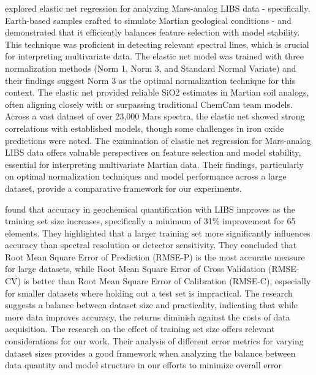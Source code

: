 \citeauthor{bai_application_2023} explored elastic net regression for analyzing Mars-analog LIBS data - specifically, Earth-based samples crafted to simulate Martian geological conditions - and demonstrated that it efficiently balances feature selection with model stability.
This technique was proficient in detecting relevant spectral lines, which is crucial for interpreting multivariate data.
The elastic net model was trained with three normalization methods (Norm 1, Norm 3, and Standard Normal Variate) and their findings suggest Norm 3 as the optimal normalization technique for this context.
The elastic net provided reliable SiO2 estimates in Martian soil analogs, often aligning closely with or surpassing traditional ChemCam team models.
Across a vast dataset of over 23,000 Mars spectra, the elastic net showed strong correlations with established models, though some challenges in iron oxide predictions were noted\cite{bai_application_2023}.
The examination of elastic net regression for Mars-analog LIBS data offers valuable perspectives on feature selection and model stability, essential for interpreting multivariate Martian data. Their findings, particularly on optimal normalization techniques and model performance across a large dataset, provide a comparative framework for our experiments.


\citeauthor{dyar_effect_2021} found that accuracy in geochemical quantification with LIBS improves as the training set size increases, specifically a minimum of 31\% improvement for 65 elements.
They highlighted that a larger training set more significantly influences accuracy than spectral resolution or detector sensitivity.
They concluded that Root Mean Square Error of Prediction (RMSE-P) is the most accurate measure for large datasets, while Root Mean Square Error of Cross Validation  (RMSE-CV) is better than Root Mean Square Error of Calibration (RMSE-C), especially for smaller datasets where holding out a test set is impractical.
The research suggests a balance between dataset size and practicality, indicating that while more data improves accuracy, the returns diminish against the costs of data acquisition\cite{dyar_effect_2021}.
The research on the effect of training set size offers relevant considerations for our work. Their analysis of different error metrics for varying dataset sizes provides a good framework when analyzing the balance between data quantity and model structure in our efforts to minimize overall error

